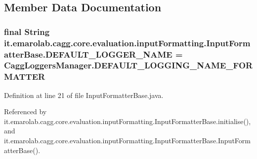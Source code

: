 \subsection{Member Data Documentation}
\hypertarget{classit_1_1emarolab_1_1cagg_1_1core_1_1evaluation_1_1inputFormatting_1_1InputFormatterBase_a2aec950b8b5c2ad209cf2ff729490321}{
\subsubsection[{D\-E\-F\-A\-U\-L\-T\-\_\-\-L\-O\-G\-G\-E\-R\-\_\-\-N\-A\-M\-E}]{\setlength{\rightskip}{0pt plus 5cm}final String it.\-emarolab.\-cagg.\-core.\-evaluation.\-input\-Formatting.\-Input\-Formatter\-Base.\-D\-E\-F\-A\-U\-L\-T\-\_\-\-L\-O\-G\-G\-E\-R\-\_\-\-N\-A\-M\-E = {\bf Cagg\-Loggers\-Manager.\-D\-E\-F\-A\-U\-L\-T\-\_\-\-L\-O\-G\-G\-I\-N\-G\-\_\-\-N\-A\-M\-E\-\_\-\-F\-O\-R\-M\-A\-T\-T\-E\-R}\hspace{0.3cm}{\ttfamily [static]}}}\label{classit_1_1emarolab_1_1cagg_1_1core_1_1evaluation_1_1inputFormatting_1_1InputFormatterBase_a2aec950b8b5c2ad209cf2ff729490321}


Definition at line 21 of file Input\-Formatter\-Base.\-java.



Referenced by it.\-emarolab.\-cagg.\-core.\-evaluation.\-input\-Formatting.\-Input\-Formatter\-Base.\-initialise(), and it.\-emarolab.\-cagg.\-core.\-evaluation.\-input\-Formatting.\-Input\-Formatter\-Base.\-Input\-Formatter\-Base().

